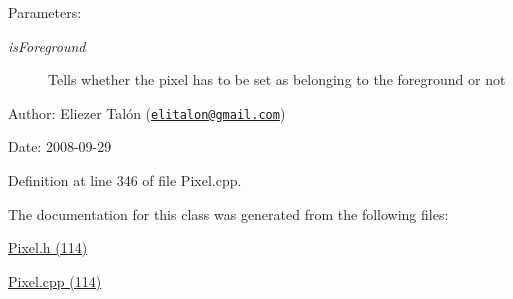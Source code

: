 \begin{Desc}
\item[Parameters:]
\begin{description}
\item[{\em isForeground}]Tells whether the pixel has to be set as belonging to the foreground or not\end{description}
\end{Desc}
\begin{Desc}
\item[Author:]Eliezer Talón (\href{mailto:elitalon@gmail.com}{\tt elitalon@gmail.com}) \end{Desc}
\begin{Desc}
\item[Date:]2008-09-29 \end{Desc}


Definition at line 346 of file Pixel.cpp.

The documentation for this class was generated from the following files:\begin{CompactItemize}
\item 
\hyperlink{_pixel_8h}{Pixel.h (114)}\item 
\hyperlink{_pixel_8cpp}{Pixel.cpp (114)}\end{CompactItemize}
